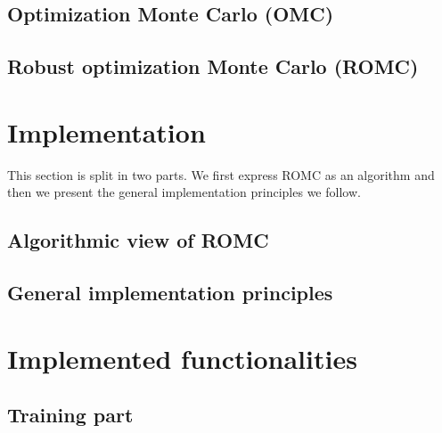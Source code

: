 \documentclass[article]{jss}
\begin{document}
\subsection{Optimization Monte Carlo (OMC)}


\subsection{Robust optimization Monte Carlo (ROMC)}


\subsection[Engine for likelihood-free inference (ELFI)]{}
\label{subsec:ELFI}


\section{Implementation}
\label{sec:implementation}
This section is split in two parts. We first express ROMC as an
algorithm and then we present the general implementation principles we
follow.

\subsection{Algorithmic view of ROMC}


\subsection{General implementation principles}
\label{subsec:general_design}


\section{Implemented functionalities}


\subsection{Training part}
\label{subsec:training}

\end{document}
